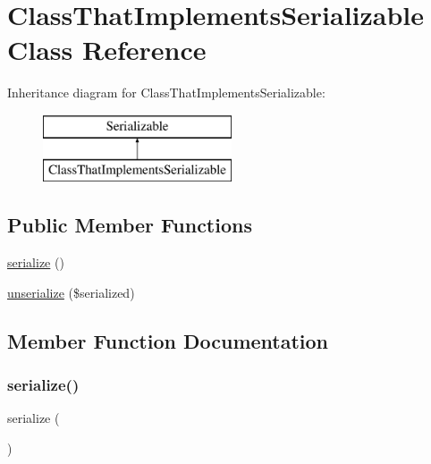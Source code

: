\hypertarget{class_class_that_implements_serializable}{}\section{Class\+That\+Implements\+Serializable Class Reference}
\label{class_class_that_implements_serializable}
Inheritance diagram for Class\+That\+Implements\+Serializable\+:\begin{figure}[H]
\begin{center}
\leavevmode
\includegraphics[height=2.000000cm]{class_class_that_implements_serializable}
\end{center}
\end{figure}
\subsection*{Public Member Functions}
\begin{DoxyCompactItemize}
\item 
\mbox{\hyperlink{class_class_that_implements_serializable_a4d9813fea8525b19a1d370eeb8fe41d6}{serialize}} ()
\item 
\mbox{\hyperlink{class_class_that_implements_serializable_ac2f3a0997c46fd9bb24fe4190f738eb0}{unserialize}} (\$serialized)
\end{DoxyCompactItemize}


\subsection{Member Function Documentation}
\mbox{\label{class_class_that_implements_serializable_a4d9813fea8525b19a1d370eeb8fe41d6}} 
\subsubsection{\texorpdfstring{serialize()}{serialize()}}
{\footnotesize\ttfamily serialize (\begin{DoxyParamCaption}{ }\end{DoxyParamCaption})}

